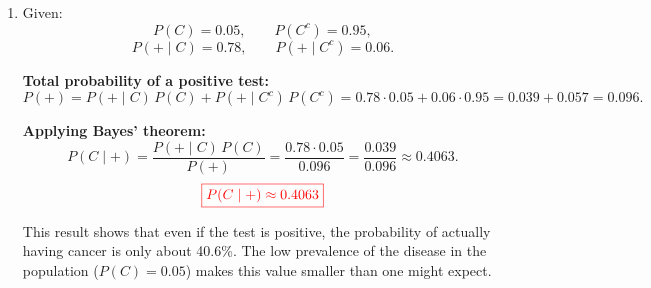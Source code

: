 \documentclass[12pt,a4paper]{article}
\begin{document}
\begin{enumerate}
\begin{enumerate}
\item \textbf{Distribution function $F(x)$:}
\[
F(x)=\int_{1}^{x}\frac{1}{6}(t+1)\,dt
=\frac{1}{6}\left[\frac{t^2}{2}+t\right]_{1}^{x}
=\frac{1}{6}\left(\frac{x^2}{2}+x-\frac{3}{2}\right)
=\frac{x^2+2x-3}{12}.
\]
\[
{\color{red}\boxed{F(x)=
\begin{cases}
0, & x\le 1,\\[4pt]
\dfrac{x^2+2x-3}{12}, & 1<x<3,\\[4pt]
1, & x\ge 3.
\end{cases}}}
\]
\end{enumerate}

\item Given:
\[
P(C)=0.05,\qquad P(C^c)=0.95,
\]
\[
P(+\mid C)=0.78,\qquad P(+\mid C^c)=0.06.
\]

\begin{center}
\end{center}

\textbf{Total probability of a positive test:}
\[
P(+)=P(+\mid C)\,P(C)+P(+\mid C^c)\,P(C^c)
=0.78\cdot0.05+0.06\cdot0.95
=0.039+0.057=0.096.
\]

\textbf{Applying Bayes' theorem:}
\[
P(C\mid +)=\frac{P(+\mid C)\,P(C)}{P(+)}=\frac{0.78\cdot0.05}{0.096}=\frac{0.039}{0.096}\approx 0.4063.
\]
\[
{\color{red}\boxed{P(C\mid +)\approx 0.4063}}
\]

This result shows that even if the test is positive, the probability of actually having cancer is only about 40.6\%. The low prevalence of the disease in the population ($P(C)=0.05$) makes this value smaller than one might expect.

\end{enumerate}
\end{document}
